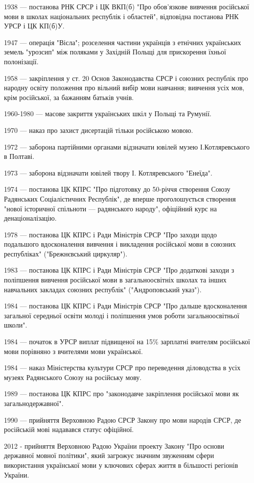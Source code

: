 1938 — постанова РНК СРСР і ЦК ВКП(б) "Про обов'язкове вивчення російської мови в школах національних республік і областей", відповідна постанова РНК УРСР і ЦК КП(б)У.

1947 — операція "Вісла"; розселення частини українців з етнічних українських земель "урозсип" між поляками у Західній Польщі для прискорення їхньої полонізації.

1958 — закріплення у ст. 20 Основ Законодавства СРСР і союзних республік про народну освіту положення про вільний вибір мови навчання; вивчення усіх мов, крім російської, за бажанням батьків учнів.

1960-1980 — масове закриття українських шкіл у Польщі та Румунії.

1970 — наказ про захист дисертацій тільки російською мовою.

1972 — заборона партійними органами відзначати ювілей музею І.Котляревського в Полтаві.

1973 — заборона відзначати ювілей твору І. Котляревського "Енеїда".

1974 — постанова ЦК КПРС "Про підготовку до 50-річчя створення Союзу Радянських Соціалістичних Республік", де вперше проголошується створення "нової історичної спільноти — радянського народу", офіційний курс на денаціоналізацію.

1978 — постанова ЦК КПРС і Ради Міністрів СРСР "Про заходи щодо подальшого вдосконалення вивчення і викладення російської мови в союзних республіках" ("Брежнєвський циркуляр").

1983 — постанова ЦК КПРС і Ради Міністрів СРСР "Про додаткові заходи з поліпшення вивчення російської мови в загальноосвітніх школах та інших навчальних закладах союзних республік" ("Андроповський указ").

1984 — постанова ЦК КПРС і Ради Міністрів СРСР "Про дальше вдосконалення загальної середньої освіти молоді і поліпшення умов роботи загальноосвітньої школи".

1984 — початок в УРСР виплат підвищеної на 15\% зарплатні вчителям російської мови порівняно з вчителями мови української.

1984 — наказ Міністерства культури СРСР про переведення діловодства в усіх музеях Радянського Союзу на російську мову.

1989 — постанова ЦК КПРС про "законодавче закріплення російської мови як загальнодержавної".

1990 — прийняття Верховною Радою СРСР Закону про мови народів СРСР, де російській мові надавався статус офіційної.

2012 - прийняття Верховною Радою України проекту Закону "Про основи державної мовної політики", який загрожує значним звуженням сфери використання української мови у ключових сферах життя в більшості регіонів України.
